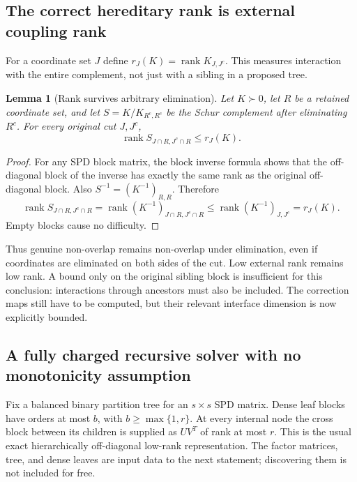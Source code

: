 \documentclass[11pt]{amsart}
\newtheorem{lemma}[theorem]{Lemma}
\theoremstyle{definition}\newtheorem{definition}[theorem]{Definition}
\theoremstyle{remark}\newtheorem{remark}[theorem]{Remark}
\numberwithin{equation}{section}
\newcommand{\rank}{\operatorname{rank}}
\begin{document}
\subsection{The correct hereditary rank is external coupling rank}
For a coordinate set $J$ define
$r_J(K)=\rank K_{J,J^c}$. This measures interaction with the entire
complement, not just with a sibling in a proposed tree.
\begin{lemma}[Rank survives arbitrary elimination]\label{ifc:lem:heredity}
Let $K\succ0$, let $R$ be a retained coordinate set, and let
$S=K/K_{R^c,R^c}$ be the Schur complement after eliminating $R^c$.
For every original cut $J,J^c$,
\begin{equation}\label{ifc:eq:heredity}
 \rank S_{J\cap R,J^c\cap R}\le r_J(K).
\end{equation}
\end{lemma}
\begin{proof}
For any SPD block matrix, the block inverse formula shows that the
off-diagonal block of the inverse has exactly the same rank as the
original off-diagonal block. Also $S^{-1}=(K^{-1})_{R,R}$. Therefore
\[
 \rank S_{J\cap R,J^c\cap R}
 =\rank(K^{-1})_{J\cap R,J^c\cap R}
 \le\rank(K^{-1})_{J,J^c}=r_J(K).
\]
Empty blocks cause no difficulty.
\end{proof}
Thus genuine non-overlap remains non-overlap under elimination, even
if coordinates are eliminated on both sides of the cut. Low external
rank remains low rank. A bound only on the original sibling block is
insufficient for this conclusion: interactions through ancestors must
also be included. The correction maps still have to be computed, but
their relevant interface dimension is now explicitly bounded.

\subsection{A fully charged recursive solver with no monotonicity assumption}
Fix a balanced binary partition tree for an $s\times s$ SPD matrix.
Dense leaf blocks have orders at most $b$, with
$b\ge\max\{1,r\}$. At every internal node the cross block between
its children is supplied as $UV^T$ of rank at most $r$. This is the
usual exact hierarchically off-diagonal low-rank representation.
The factor matrices, tree, and dense leaves are input data to the next
statement; discovering them is not included for free.
\end{document}
